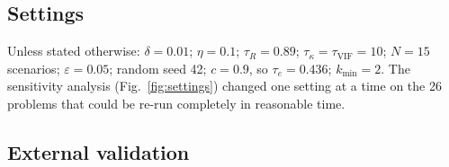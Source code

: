 \documentclass[pdflatex,sn-nature]{sn-jnl}
\theoremstyle{plain}
\begin{document}
\subsection*{Settings}

Unless stated otherwise: $\delta=0.01$; $\eta=0.1$; $\tau_R=0.89$; $\tau_\kappa=\tau_{\mathrm{VIF}}=10$; $N=15$ scenarios; $\varepsilon=0.05$; random seed 42; $c=0.9$, so $\tau_e=0.436$; $k_{\min}=2$. The sensitivity analysis (Fig.~\ref{fig:settings}) changed one setting at a time on the 26 problems that could be re-run completely in reasonable time.

\subsection*{External validation}
\end{document}
